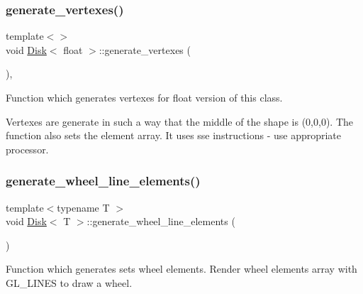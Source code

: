 \mbox{\label{classDisk_a55648a13c42982087f60742da15c2c41}} 
\subsubsection{\texorpdfstring{generate\+\_\+vertexes()}{generate\_vertexes()}\hspace{0.1cm}{\footnotesize\ttfamily [2/2]}}
{\footnotesize\ttfamily template$<$$>$ \\
void \mbox{\hyperlink{classDisk}{Disk}}$<$ float $>$\+::generate\+\_\+vertexes (\begin{DoxyParamCaption}{ }\end{DoxyParamCaption})\hspace{0.3cm}{\ttfamily [inline]}, {\ttfamily [private]}}



Function which generates vertexes for float version of this class. 

Vertexes are generate in such a way that the middle of the shape is (0,0,0). The function also sets the element array. It uses sse instructions -\/ use appropriate processor. \mbox{\label{classDisk_a4637847208b7236010085ca67f49e39a}} 
\subsubsection{\texorpdfstring{generate\+\_\+wheel\+\_\+line\+\_\+elements()}{generate\_wheel\_line\_elements()}}
{\footnotesize\ttfamily template$<$typename T $>$ \\
void \mbox{\hyperlink{classDisk}{Disk}}$<$ T $>$\+::generate\+\_\+wheel\+\_\+line\+\_\+elements (\begin{DoxyParamCaption}{ }\end{DoxyParamCaption})\hspace{0.3cm}{\ttfamily [private]}}



Function which generates sets wheel elements. Render wheel elements array with G\+L\+\_\+\+L\+I\+N\+ES to draw a wheel. 

\mbox{\label{classDisk_ad6bc474ffecbc5de6f8fdd90ba5eddfe}} 
